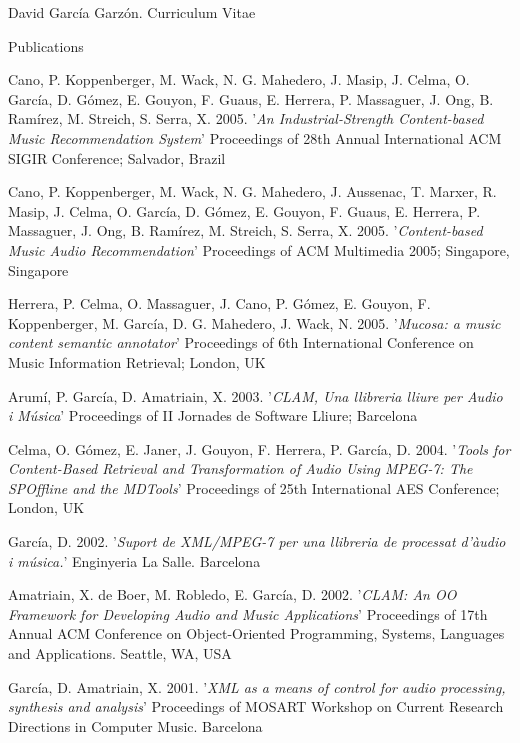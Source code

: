 \documentclass{article}
\begin{document}
\begin{cv}{David García Garzón. Curriculum Vitae}
\begin{cvlist}{Publications}
\item[] {\sc Cano, P. Koppenberger, M. Wack, N. G. Mahedero, J. Masip, J. Celma, O. García, D. Gómez, E. Gouyon, F. Guaus, E. Herrera, P. Massaguer, J. Ong, B. Ramírez, M. Streich, S. Serra, X.} 2005.
'{\em An Industrial-Strength Content-based Music Recommendation System}'
Proceedings of 28th Annual International ACM SIGIR Conference; Salvador, Brazil

\item[] {\sc Cano, P. Koppenberger, M. Wack, N. G. Mahedero, J. Aussenac, T. Marxer, R. Masip, J. Celma, O. García, D. Gómez, E. Gouyon, F. Guaus, E. Herrera, P. Massaguer, J. Ong, B. Ramírez, M. Streich, S. Serra, X.} 2005.
'{\em Content-based Music Audio Recommendation}'
Proceedings of ACM Multimedia 2005; Singapore, Singapore

\item[] {\sc Herrera, P. Celma, O. Massaguer, J. Cano, P. Gómez, E. Gouyon, F. Koppenberger, M. García, D. G. Mahedero, J. Wack, N.} 2005.
'{\em Mucosa: a music content semantic annotator}'
Proceedings of 6th International Conference on Music Information Retrieval; London, UK

\item[] {\sc Arumí, P. García, D. Amatriain, X.} 2003.
'{\em CLAM, Una llibreria lliure per Audio i Música}'
Proceedings of II Jornades de Software Lliure; Barcelona

\item[] {\sc Celma, O. Gómez, E. Janer, J. Gouyon, F. Herrera, P. García, D.} 2004.
'{\em Tools for Content-Based Retrieval and Transformation of Audio Using MPEG-7: The SPOffline and the MDTools}'
Proceedings of 25th International AES Conference; London, UK

\item[] {\sc García, D.} 2002.
'{\em Suport de XML/MPEG-7 per una llibreria de processat d'àudio i música.}'
Enginyeria La Salle. Barcelona

\item[] {\sc Amatriain, X. de Boer, M. Robledo, E. García, D.} 2002.
'{\em CLAM: An OO Framework for Developing Audio and Music Applications}'
Proceedings of 17th Annual ACM Conference on Object-Oriented Programming, Systems, Languages and Applications. Seattle, WA, USA

\item[] {\sc García, D. Amatriain, X.} 2001.
'{\em XML as a means of control for audio processing, synthesis and analysis}'
Proceedings of MOSART Workshop on Current Research Directions in Computer Music. Barcelona
	

\end{cvlist}
\end{cv}
\end{document}
